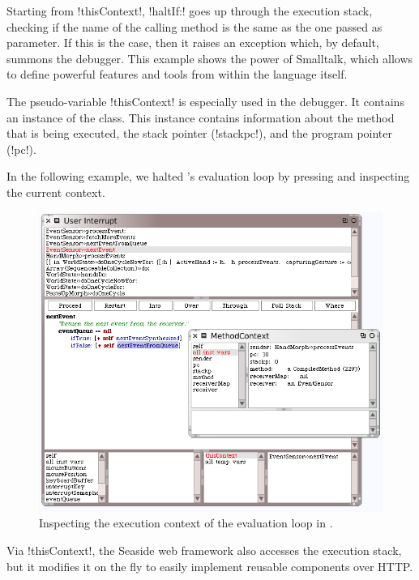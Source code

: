 \documentclass[a4paper,10pt,twoside]{book}
\begin{document}
Starting from \ct!thisContext!, \ct!haltIf:! goes up through the execution stack, checking if the name of the calling method is the same as the one passed as parameter.
If this is the case, then it raises an exception which, by default, summons the debugger.
This example shows the power of Smalltalk, which allows to define powerful features and tools from within the language itself.

The pseudo-variable \ct!thisContext! is especially used in the \squeak debugger.
It contains an instance of the  class.
This instance contains information about the method that is being executed, the stack pointer (\ct!stackpc!), and the program pointer (\ct!pc!).

In the following example, we halted \squeak's evaluation loop by pressing  and inspecting the current context.

\begin{figure}[ht]\centering
	\includegraphics[width=\linewidth]{MethodContext}
	\caption{Inspecting the execution context of the evaluation loop in \squeak.\label{fig:MethodContext}}
\end{figure}

Via \ct!thisContext!, the Seaside web framework also accesses the execution stack, but it modifies it on the fly to easily implement reusable components over HTTP.

\end{document}
